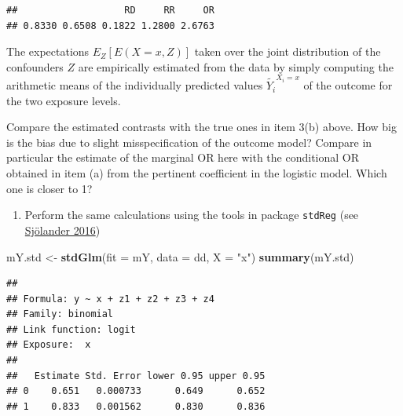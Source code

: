 \documentclass[
]{book}
\newenvironment{Shaded}{\begin{snugshade}}{\end{snugshade}}
\newcommand{\AttributeTok}[1]{\textcolor[rgb]{0.13,0.29,0.53}{#1}}
\newcommand{\DecValTok}[1]{\textcolor[rgb]{0.00,0.00,0.81}{#1}}
\newcommand{\FunctionTok}[1]{\textcolor[rgb]{0.13,0.29,0.53}{\textbf{#1}}}
\newcommand{\NormalTok}[1]{#1}
\newcommand{\OtherTok}[1]{\textcolor[rgb]{0.56,0.35,0.01}{#1}}
\newcommand{\SpecialCharTok}[1]{\textcolor[rgb]{0.81,0.36,0.00}{\textbf{#1}}}
\newcommand{\StringTok}[1]{\textcolor[rgb]{0.31,0.60,0.02}{#1}}
\providecommand{\tightlist}{%
  \setlength{\itemsep}{0pt}\setlength{\parskip}{0pt}}
\begin{document}
\begin{Shaded}
\end{Shaded}

\begin{verbatim}
##                   RD     RR     OR 
## 0.8330 0.6508 0.1822 1.2800 2.6763
\end{verbatim}

The expectations \(E_Z[E(X=x, Z)]\) taken over the joint
distribution of the confounders \(Z\) are
empirically estimated from the data by simply computing the
arithmetic means of the individually
predicted values \(\widetilde{Y_i}^{X_i=x}\)
of the outcome for the two exposure levels.

Compare the estimated contrasts with the true ones in item 3(b) above.
How big is the bias due to
slight misspecification of the outcome model?
Compare in particular the estimate of the marginal OR here with
the conditional OR obtained in item (a) from the pertinent
coefficient in the logistic model. Which one is closer to 1?

\begin{enumerate}
\def\labelenumi{\arabic{enumi}.}
\setcounter{enumi}{3}
\tightlist
\item
  Perform the same calculations using the tools in package
  \texttt{stdReg}
  (see \href{https://doi.org/10.1007/s10654-016-0157-3}{Sjölander 2016})
\end{enumerate}

\begin{Shaded}
\begin{Highlighting}[]
\NormalTok{mY.std }\OtherTok{\textless{}{-}} \FunctionTok{stdGlm}\NormalTok{(}\AttributeTok{fit =}\NormalTok{ mY, }\AttributeTok{data =}\NormalTok{ dd, }\AttributeTok{X =} \StringTok{"x"}\NormalTok{)}
\FunctionTok{summary}\NormalTok{(mY.std)}
\end{Highlighting}
\end{Shaded}

\begin{verbatim}
## 
## Formula: y ~ x + z1 + z2 + z3 + z4
## Family: binomial 
## Link function: logit 
## Exposure:  x 
## 
##   Estimate Std. Error lower 0.95 upper 0.95
## 0    0.651   0.000733      0.649      0.652
## 1    0.833   0.001562      0.830      0.836
\end{verbatim}
\end{document}
